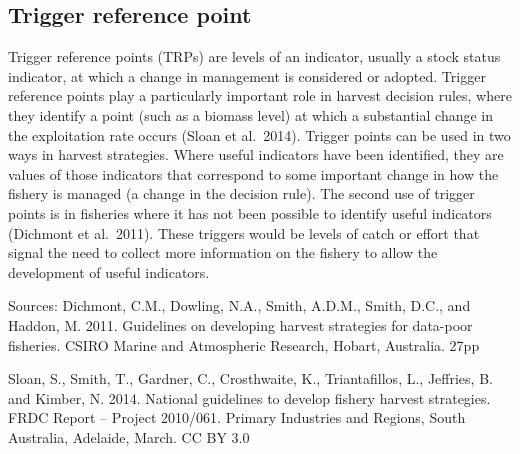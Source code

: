 \documentclass[
  11pt,
]{book}
\begin{document}
\hypertarget{trigger-reference-point}{%
\subsection{Trigger reference point}\label{trigger-reference-point}}

Trigger reference points (TRPs) are levels of an indicator, usually a stock status indicator, at which a change in management is considered or adopted. Trigger reference points play a particularly important role in harvest decision rules, where they identify a point (such as a biomass level) at which a substantial change in the exploitation rate occurs (Sloan et al.~2014). Trigger points can be used in two ways in harvest strategies. Where useful indicators have been identified, they are values of those indicators that correspond to some important change in how the fishery is managed (a change in the decision rule). The second use of trigger points is in fisheries where it has not been possible to identify useful indicators (Dichmont et al.~2011). These triggers would be levels of catch or effort that signal the need to collect more information on the fishery to allow the development of useful indicators.

Sources: Dichmont, C.M., Dowling, N.A., Smith, A.D.M., Smith, D.C., and Haddon, M. 2011. Guidelines on developing harvest strategies for data-poor fisheries. CSIRO Marine and Atmospheric Research, Hobart, Australia. 27pp

Sloan, S., Smith, T., Gardner, C., Crosthwaite, K., Triantafillos, L., Jeffries, B. and Kimber, N. 2014. National guidelines to develop fishery harvest strategies. FRDC Report -- Project 2010/061. Primary Industries and Regions, South Australia, Adelaide, March. CC BY 3.0

  
\end{document}
